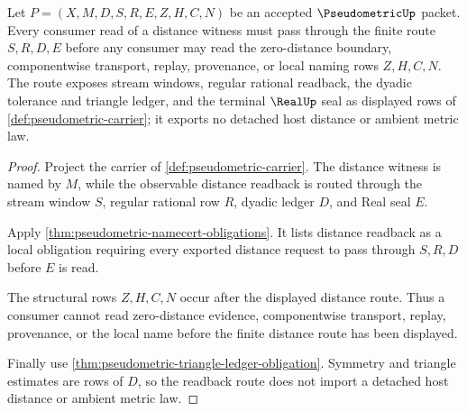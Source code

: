 \begin{theorem}
\label{thm:pseudometric-distance-readback-obligation}
Let $P=(X,M,D,S,R,E,Z,H,C,N)$ be an accepted $\PseudometricUp$ packet. Every consumer read of a distance witness must pass through the finite route $S,R,D,E$ before any consumer may read the zero-distance boundary, componentwise transport, replay, provenance, or local naming rows $Z,H,C,N$. The route exposes stream windows, regular rational readback, the dyadic tolerance and triangle ledger, and the terminal $\RealUp$ seal as displayed rows of \autoref{def:pseudometric-carrier}; it exports no detached host distance or ambient metric law.
\end{theorem}
\begin{proof}
Project the carrier of \autoref{def:pseudometric-carrier}. The distance witness is named by $M$, while the observable distance readback is routed through the stream window $S$, regular rational row $R$, dyadic ledger $D$, and Real seal $E$.

Apply \autoref{thm:pseudometric-namecert-obligations}. It lists distance readback as a local obligation requiring every exported distance request to pass through $S,R,D$ before $E$ is read.

The structural rows $Z,H,C,N$ occur after the displayed distance route. Thus a consumer cannot read zero-distance evidence, componentwise transport, replay, provenance, or the local name before the finite distance route has been displayed.

Finally use \autoref{thm:pseudometric-triangle-ledger-obligation}. Symmetry and triangle estimates are rows of $D$, so the readback route does not import a detached host distance or ambient metric law.
\end{proof}

